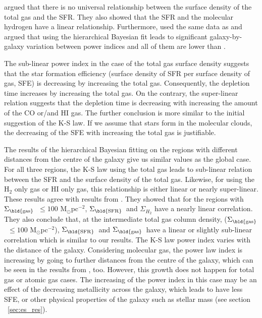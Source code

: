 \documentclass[useAMS,usenatbib]{mn2e}
\newcommand \sigmagas    {$\Sigma_{\rm \bld {gas }} $\ }
\newcommand \sigmasfr     {$\Sigma_{\rm \bld {SFR }} $\ }
\begin{document}
 \cite{Bigiel08} argued that there is no universal relationship between the surface density of the total gas and the SFR. They also showed that the SFR and the molecular hydrogen have a linear relationship. Furthermore, \cite{Shetty13} used the same data as \cite{Bigiel08} and argued that using the hierarchical Bayesian fit leads to significant galaxy-by-galaxy variation between power indices and all of them are lower than \cite{Bigiel08}. 

The sub-linear power index in the case of the total gas surface density suggests that the star formation efficiency (surface density of SFR per surface density of gas, SFE) is decreasing by increasing the total gas. Consequently, the depletion time increases by increasing the total gas. On the contrary, the super-linear relation suggests that the depletion time is decreasing with increasing the amount of the CO or/and HI gas. The further conclusion is more similar to the initial suggestion of the K-S law. If we assume that stars form in the molecular clouds, the decreasing of the SFE with increasing the total gas is justifiable.  

The results of the hierarchical Bayesian fitting on the regions with different distances from the centre of the galaxy give us similar values as the global case. For all three regions, the K-S law using the total gas leads to sub-linear relation between the SFR and the surface density of the total gas. Likewise, for using the H$_{2}$ only gas or HI only gas, this relationship is either linear or nearly super-linear. These results agree with results from \cite{Krumholz09}. They showed that for the regions with \sigmagas $\leq 100$ M$_{\odot}$pc$^{-2}$, \sigmasfr and $\Sigma_{H_2}$ have a nearly linear correlation. They also conclude that, at the intermediate total gas column density, (\sigmagas $\leq 100$ M$_{\odot}$pc$^{-2}$), \sigmasfr and \sigmagas have a linear or slightly sub-linear correlation which is similar to our results. The K-S law power index varies with the distance of the galaxy. Considering molecular gas, the power law index is increasing by going to further distances from the centre of the galaxy, which can be seen in the results from \cite{Ford13}, too. However, this growth does not happen for total gas or atomic gas cases. The increasing of the power index in this case may be an effect of the decreasing metallicity across the galaxy, which leads to have less SFE, or other physical properties of the galaxy such as stellar mass (see section ~\ref{sec:es_res}).
  
\end{document}
